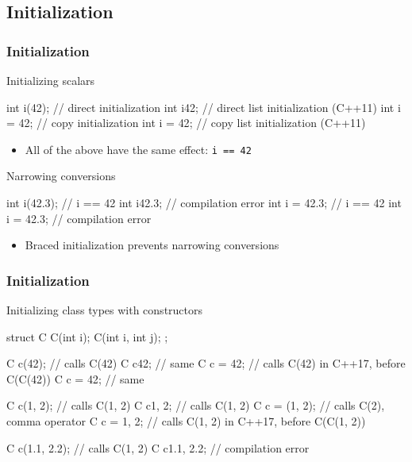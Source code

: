 \subsection[Init]{Initialization}

\begin{frame}[fragile]
  \frametitle{Initialization}
  \begin{block}{Initializing scalars}
    \begin{cppcode}
      int i(42);    // direct initialization
      int i{42};    // direct list initialization (C++11)
      int i = 42;   // copy initialization
      int i = {42}; // copy list initialization (C++11)
    \end{cppcode}
    \begin{itemize}
      \item All of the above have the same effect: \texttt{i == 42}
    \end{itemize}
  \end{block}
  \begin{block}{Narrowing conversions}
    \begin{cppcode}
      int i(42.3);    // i == 42
      int i{42.3};    // compilation error
      int i = 42.3;   // i == 42
      int i = {42.3}; // compilation error
    \end{cppcode}
    \begin{itemize}
      \item Braced initialization prevents narrowing conversions
    \end{itemize}
  \end{block}
\end{frame}

\begin{frame}[fragile,shrink=10]
  \frametitle{Initialization}
  \begin{block}{Initializing class types with constructors}
    \begin{cppcode}
      struct C {
        C(int i);
        C(int i, int j);
      };

      C c(42);    // calls C(42)
      C c{42};    // same
      C c = 42;   // calls C(42) in C++17, before C(C(42))
      C c = {42}; // same

      C c(1, 2);    // calls C(1, 2)
      C c{1, 2};    // calls C(1, 2)
      C c = (1, 2); // calls C(2), comma operator
      C c = {1, 2}; // calls C(1, 2) in C++17, before C(C(1, 2))

      C c(1.1, 2.2); // calls C(1, 2)
      C c{1.1, 2.2}; // compilation error
    \end{cppcode}
  \end{block}
\end{frame}

